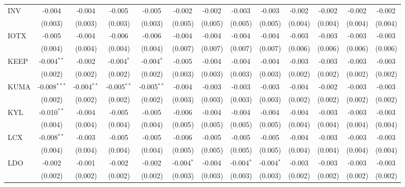 \begin{table}[!htbp]
\begin{tabular}{@{\extracolsep{5pt}}lcccccccccccc}
 INV & -0.004$^{}$ & -0.004$^{}$ & -0.005$^{}$ & -0.005$^{}$ & -0.002$^{}$ & -0.002$^{}$ & -0.003$^{}$ & -0.003$^{}$ & -0.002$^{}$ & -0.002$^{}$ & -0.002$^{}$ & -0.002$^{}$ \\
  & (0.003) & (0.003) & (0.003) & (0.003) & (0.005) & (0.005) & (0.005) & (0.005) & (0.004) & (0.004) & (0.004) & (0.004) \\
 IOTX & -0.005$^{}$ & -0.004$^{}$ & -0.006$^{}$ & -0.006$^{}$ & -0.004$^{}$ & -0.004$^{}$ & -0.004$^{}$ & -0.004$^{}$ & -0.003$^{}$ & -0.003$^{}$ & -0.003$^{}$ & -0.003$^{}$ \\
  & (0.004) & (0.004) & (0.004) & (0.004) & (0.007) & (0.007) & (0.007) & (0.007) & (0.006) & (0.006) & (0.006) & (0.006) \\
 KEEP & -0.004$^{**}$ & -0.002$^{}$ & -0.004$^{*}$ & -0.004$^{*}$ & -0.005$^{}$ & -0.004$^{}$ & -0.004$^{}$ & -0.004$^{}$ & -0.003$^{}$ & -0.003$^{}$ & -0.003$^{}$ & -0.003$^{}$ \\
  & (0.002) & (0.002) & (0.002) & (0.002) & (0.003) & (0.003) & (0.003) & (0.003) & (0.002) & (0.002) & (0.002) & (0.002) \\
 KUMA & -0.008$^{***}$ & -0.004$^{**}$ & -0.005$^{**}$ & -0.005$^{**}$ & -0.004$^{}$ & -0.003$^{}$ & -0.003$^{}$ & -0.003$^{}$ & -0.004$^{}$ & -0.002$^{}$ & -0.003$^{}$ & -0.003$^{}$ \\
  & (0.002) & (0.002) & (0.002) & (0.002) & (0.003) & (0.003) & (0.003) & (0.003) & (0.002) & (0.002) & (0.002) & (0.002) \\
 KYL & -0.010$^{**}$ & -0.004$^{}$ & -0.005$^{}$ & -0.005$^{}$ & -0.006$^{}$ & -0.004$^{}$ & -0.004$^{}$ & -0.004$^{}$ & -0.004$^{}$ & -0.003$^{}$ & -0.003$^{}$ & -0.003$^{}$ \\
  & (0.004) & (0.004) & (0.004) & (0.004) & (0.005) & (0.005) & (0.005) & (0.005) & (0.004) & (0.004) & (0.004) & (0.004) \\
 LCX & -0.008$^{**}$ & -0.003$^{}$ & -0.005$^{}$ & -0.005$^{}$ & -0.006$^{}$ & -0.005$^{}$ & -0.005$^{}$ & -0.005$^{}$ & -0.004$^{}$ & -0.003$^{}$ & -0.003$^{}$ & -0.003$^{}$ \\
  & (0.004) & (0.004) & (0.004) & (0.004) & (0.005) & (0.005) & (0.005) & (0.005) & (0.004) & (0.004) & (0.004) & (0.004) \\
 LDO & -0.002$^{}$ & -0.001$^{}$ & -0.002$^{}$ & -0.002$^{}$ & -0.004$^{*}$ & -0.004$^{}$ & -0.004$^{*}$ & -0.004$^{*}$ & -0.003$^{}$ & -0.003$^{}$ & -0.003$^{}$ & -0.003$^{}$ \\
  & (0.002) & (0.002) & (0.002) & (0.002) & (0.003) & (0.003) & (0.003) & (0.003) & (0.002) & (0.002) & (0.002) & (0.002) \\

\end{tabular}
\end{table}
